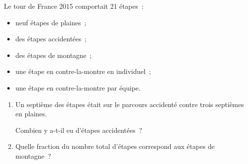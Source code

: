 \documentclass[exercice]{thedocument}%
\begin{document}
%
    {\centering{}\par}
    Le tour de France 2015 comportait 21 étapes~:
    \begin{itemize}[label=$-$]
        \item neuf étapes de plaines~;
        \item des étapes accidentées~;
        \item des étapes de montagne~;
        \item une étape en contre-la-montre en individuel~;
        \item une étape en contre-la-montre par équipe.
    \end{itemize}
    \begin{enumerate}
        \item Un septième des étapes était sur le parcours accidenté contre trois
        septièmes en plaines.\par Combien y a-t-il eu d'étapes accidentées~?
        \item Quelle fraction du nombre total d'étapes correspond aux étapes de
        montagne~?
    \end{enumerate}
\end{document}
